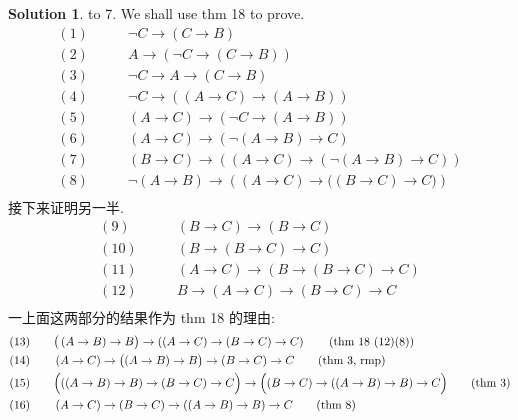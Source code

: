 \documentclass[12pt, a4paper]{ctexart} %
\theoremstyle{plain}
\theoremstyle{definition}
\newtheorem*{solution}{Solution}
\begin{document}
\begin{solution} to 7.
    We shall use thm 18 to prove.
    \begin{align*}
        (1) & \quad \quad \neg C \to \left(C \to B\right) \tag{thm 6} \\
        (2) & \quad \quad A \to  \left(\neg C \to \left(C \to B\right)\right)  \tag{thm 1, rmp}\\
        (3) & \quad \quad \neg C \to A \to \left(C \to B\right) \tag{thm 3} \\
        (4) & \quad \quad \neg C \to \left(\left(A \to C\right) \to \left(A \to B\right)\right) \tag{A2, rmp}\\
        (5) & \quad \quad \left(A \to C\right) \to \left(\neg C \to \left(A \to B\right) \right) \tag{thm 3, rmp} \\
        (6) & \quad \quad \left(A \to C\right) \to \left(\neg \left(A \to B\right) \to C\right) \tag{thm 14, thm 8} \\
        (7) & \quad \quad \left(B \to C\right) \to \left(\left(A \to C\right) \to \left(\neg \left(A \to B\right) \to C\right)\right) \tag{thm 1, rmp}\\
        (8) & \quad \quad \neg \left(A \to B\right)  \to \left(\left(A \to C\right) \to \big(\left(B \to C\right) \to C\big)\right) \tag{多用几次thm 3}\\
    \end{align*}
    接下来证明另一半.
    \begin{align*}
        (9) & \quad \quad \left(B \to C\right) \to \left(B \to C\right) \tag{thm 1} \\
        (10) & \quad \quad \left(B \to \left(B \to C\right) \to C\right) \tag{thm 3}\\
        (11) & \quad \quad \left(A \to C\right) \to \left(B \to \left(B \to C\right) \to C\right) \tag{thm 1, rmp} \\
        (12) & \quad \quad B \to \left(A \to C\right) \to \left(B \to C\right) \to C \tag{thm 3, rmp} \\
    \end{align*}
    一上面这两部分的结果作为 thm 18 的理由: 
    \begin{align*}
        (13)& \quad \quad \big(\left(A \to B\right) \to B\big) \to \left((A \to C) \to \left(B \to C\right) \to C\right) \tag{thm 18 (12)(8)}\\ 
        (14)& \quad \quad \left(A \to C\right)   \to \bigl( \left(A \to B\right) \to B     \bigr) \to \left(B \to C\right) \to C\tag{thm 3, rmp}\\
        (15)& \quad \quad \Bigl(( \left(A \to B \right) \to B ) \to \left(B \to C\right) \to C    \Bigr) \to \Bigl( \left(B \to C\right) \to \left( \left(A \to B\right) \to B\right) \to C\Bigr)   \tag{thm 3} \\
        (16)& \quad \quad \left(A \to C\right) \to \left(B \to C\right) \to \left(\left(A \to B\right) \to B   \right) \to C\tag{thm 8} \\
    \end{align*}
\end{solution}
\end{document}
